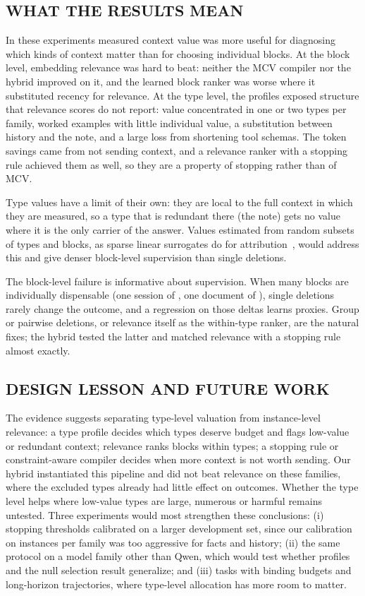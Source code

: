 \subsection{WHAT THE RESULTS MEAN}
In these experiments measured context value was more useful for diagnosing which kinds of context matter than for
choosing individual blocks. At the block level, embedding relevance was hard to beat: neither the MCV compiler nor the
hybrid improved on it, and the learned block ranker was worse where it substituted recency for relevance. At the type
level, the profiles exposed structure that relevance scores do not report: value concentrated in one or two types per
family, worked examples with little individual value, a substitution between history and the note, and a large loss
from shortening tool schemas. The token savings came from not sending context, and a relevance ranker with a stopping
rule achieved them as well, so they are a property of stopping rather than of MCV.

Type values have a limit of their own: they are local to the full context in which they are measured, so a type that is
redundant there (the note) gets no value where it is the only carrier of the answer. Values estimated from random subsets
of types and blocks, as sparse linear surrogates do for attribution~\cite{contextcite2024}, would address this and give
denser block-level supervision than single deletions.

The block-level failure is informative about supervision. When many blocks are individually dispensable (one session of
\RNumSessions, one document of \RNumDocs), single deletions rarely change the outcome, and a regression on those deltas
learns proxies. Group or pairwise deletions, or relevance itself as the within-type ranker, are the natural fixes; the
hybrid tested the latter and matched relevance with a stopping rule almost exactly.

\subsection{DESIGN LESSON AND FUTURE WORK}
The evidence suggests separating type-level valuation from instance-level relevance: a type profile decides which
types deserve budget and flags low-value or redundant context; relevance ranks blocks within types; a stopping rule or
constraint-aware compiler decides when more context is not worth sending. Our hybrid instantiated this pipeline and did
not beat relevance on these families, where the excluded types already had little effect on outcomes. Whether the type
level helps where low-value types are large, numerous or harmful remains untested. Three experiments would most
strengthen these conclusions: (i) stopping thresholds calibrated on a larger development set, since our calibration on
\RNCalib instances per family was too aggressive for facts and history; (ii) the same protocol on a model family other
than Qwen, which would test whether profiles and the null selection result generalize; and (iii) tasks with binding
budgets and long-horizon trajectories, where type-level allocation has more room to matter.

